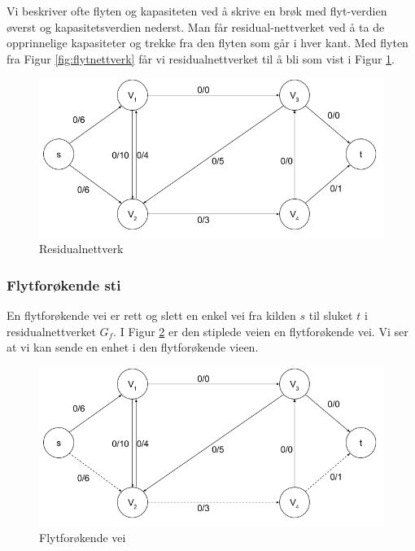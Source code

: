 \begin{boxed}
Vi beskriver ofte flyten og kapasiteten ved å skrive en brøk med flyt-verdien øverst og kapasitetsverdien nederst. Man får residual-nettverket ved å ta de opprinnelige kapasiteter og trekke fra den flyten som går i hver kant. Med flyten fra Figur \ref{fig:flytnettverk} får vi residualnettverket til å bli som vist i Figur \ref{fig:residualnettverk}.

\begin{figure}[H]
\includegraphics[scale=0.6]{images/residualnettverk}
\centering %
\caption{Residualnettverk}
\label{fig:residualnettverk}
\end{figure}
\end{boxed}

\subsubsection{Flytforøkende sti}
En flytforøkende vei er rett og slett en enkel vei fra kilden $s$ til sluket $t$ i residualnettverket $G_f$. I Figur \ref{fig:flytforokendevei} er den stiplede veien en flytforøkende vei. Vi ser at vi kan sende en enhet i den flytforøkende vieen.

\begin{figure}[H]
\includegraphics[scale=0.6]{images/flytforokendevei}
\centering %
\caption{Flytforøkende vei}
\label{fig:flytforokendevei}
\end{figure}

